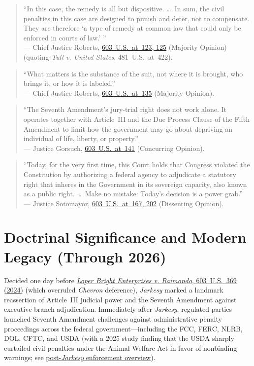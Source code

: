 \documentclass[12pt]{article}
\begin{document}
\begin{quote}
``In this case, the remedy is all but dispositive. \ldots\ In sum, the civil penalties in this case are designed to punish and deter, not to compensate. They are therefore `a type of remedy at common law that could only be enforced in courts of law.' '' \\
--- Chief Justice Roberts, \href{https://supreme.justia.com/cases/federal/us/603/22-859/}{603~U.S.~at~123, 125} (Majority Opinion) (quoting \textit{Tull v. United States}, 481~U.S.~at~422).
\end{quote}

\begin{quote}
``What matters is the substance of the suit, not where it is brought, who brings it, or how it is labeled.'' \\
--- Chief Justice Roberts, \href{https://supreme.justia.com/cases/federal/us/603/22-859/}{603~U.S.~at~135} (Majority Opinion).
\end{quote}

\begin{quote}
``The Seventh Amendment's jury-trial right does not work alone. It operates together with Article~III and the Due Process Clause of the Fifth Amendment to limit how the government may go about depriving an individual of life, liberty, or property.'' \\
--- Justice Gorsuch, \href{https://supreme.justia.com/cases/federal/us/603/22-859/}{603~U.S.~at~141} (Concurring Opinion).
\end{quote}

\begin{quote}
``Today, for the very first time, this Court holds that Congress violated the Constitution by authorizing a federal agency to adjudicate a statutory right that inheres in the Government in its sovereign capacity, also known as a public right. \ldots\ Make no mistake: Today's decision is a power grab.'' \\
--- Justice Sotomayor, \href{https://supreme.justia.com/cases/federal/us/603/22-859/}{603~U.S.~at~167, 202} (Dissenting Opinion).
\end{quote}

\section{Doctrinal Significance and Modern Legacy (Through 2026)}
Decided one day before \href{https://supreme.justia.com/cases/federal/us/603/22-451/}{\textit{Loper Bright Enterprises v. Raimondo}, 603~U.S.~369 (2024)} (which overruled \textit{Chevron} deference), \textit{Jarkesy} marked a landmark reassertion of Article~III judicial power and the Seventh Amendment against executive-branch adjudication. Immediately after \textit{Jarkesy}, regulated parties launched Seventh Amendment challenges against administrative penalty proceedings across the federal government---including the FCC, FERC, NLRB, DOL, CFTC, and USDA (with a 2025 study finding that the USDA sharply curtailed civil penalties under the Animal Welfare Act in favor of nonbinding warnings; see \href{https://en.wikipedia.org/wiki/SEC_v._Jarkesy}{post-\textit{Jarkesy} enforcement overview}).
\end{document}
